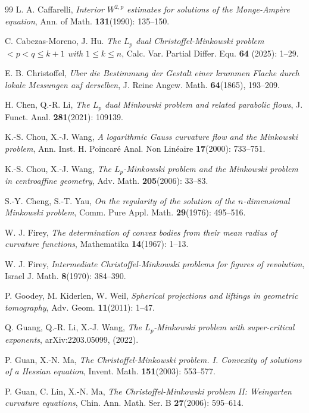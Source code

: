 \documentclass[12pt]{amsart}
\numberwithin{equation}{section}
\newcommand{\8}{\infty}
\begin{document}
\begin{thebibliography}{99}
L. A. Caffarelli, \textit{Interior $W^{2,p}$ estimates for solutions of the Monge-Amp\`ere equation}, Ann. of Math. \textbf{131}(1990): 135--150.

C. Cabezas-Moreno, J. Hu. \textit{The $L_ {p} $ dual Christoffel-Minkowski problem $<p<q\le k+1$ with $1\le k\le n$}, Calc. Var. Partial Differ. Equ. \textbf{64} (2025): 1--29.

E. B. Christoffel, \textit{Uber die Bestimmung der Gestalt einer krummen Flache durch lokale Messungen auf derselben}, J. Reine Angew. Math. \textbf{64}(1865), 193--209.

H. Chen, Q.-R. Li, \textit{The $L_p$ dual Minkowski problem and related parabolic flows}, J. Funct. Anal. \textbf{281}(2021): 109139.

K.-S. Chou, X.-J. Wang, \textit{A logarithmic Gauss curvature flow and the Minkowski problem}, Ann. Inst. H. Poincar\'e Anal. Non Lin\'eaire \textbf{17}(2000): 733--751.

K.-S. Chou, X.-J. Wang, \textit{The $L_p$-Minkowski problem and the Minkowski problem in centroaffine geometry}, Adv. Math. \textbf{205}(2006): 33--83.

S.-Y. Cheng, S.-T. Yau, \textit{On the regularity of the solution of the $n$-dimensional Minkowski problem}, Comm. Pure Appl. Math. \textbf{29}(1976): 495--516.

W. J. Firey, \textit{The determination of convex bodies from their mean radius of curvature functions}, Mathematika \textbf{14}(1967): 1--13.

W. J. Firey, \textit{Intermediate Christoffel-Minkowski problems for figures of revolution}, Israel J. Math. \textbf{8}(1970): 384--390.

P. Goodey, M. Kiderlen, W. Weil, \textit{Spherical projections and liftings in geometric tomography}, Adv. Geom. \textbf{11}(2011): 1--47.

Q. Guang, Q.-R. Li, X.-J. Wang, \textit{The $L_p$-Minkowski problem with super-critical exponents}, arXiv:2203.05099, (2022).

P. Guan, X.-N. Ma, \textit{The Christoffel-Minkowski problem. I. Convexity of solutions of a Hessian equation}, Invent. Math. \textbf{151}(2003): 553--577.

P. Guan, C. Lin, X.-N. Ma, \textit{The Christoffel-Minkowski problem II: Weingarten curvature equations}, Chin. Ann. Math. Ser. B \textbf{27}(2006): 595--614.


\end{thebibliography}
\end{document}
